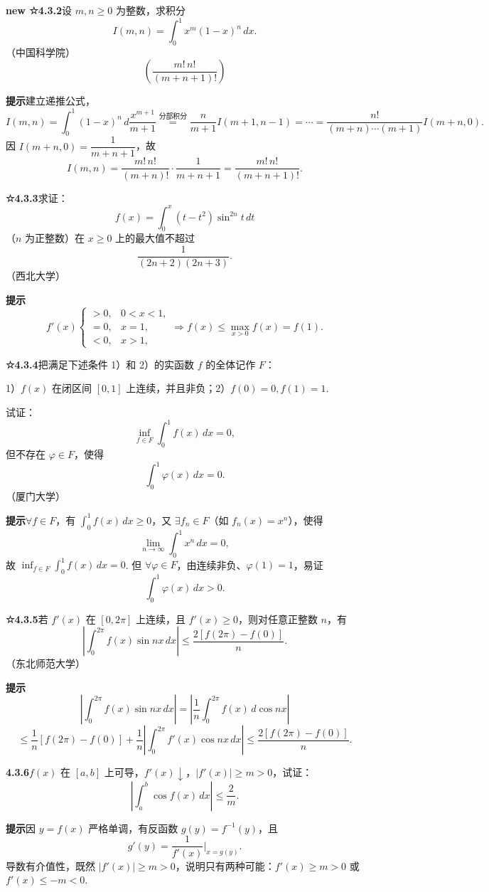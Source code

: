 \documentclass[UTF8, 12pt, fontset=fandol, oneside]{ctexart}
\begin{document}
\noindent\textbf{new ☆4.3.2}\quad 设 $m,n\ge0$ 为整数，求积分
\[
I(m,n)=\int_0^1x^m(1-x)^n\,dx.
\]
（中国科学院）
\[
\left(\frac{m!\,n!}{(m+n+1)!}\right)
\]

\noindent\textbf{提示}\quad 建立递推公式，
\[
I(m,n)=\int_0^1(1-x)^n\,d\frac{x^{m+1}}{m+1}
\stackrel{\text{分部积分}}{=}
\frac n{m+1}I(m+1,n-1)=\cdots
=\frac{n!}{(m+n)\cdots(m+1)}I(m+n,0).
\]
因 $I(m+n,0)=\dfrac1{m+n+1}$，故
\[
I(m,n)=\frac{m!\,n!}{(m+n)!}\cdot\frac1{m+n+1}
=\frac{m!\,n!}{(m+n+1)!}.
\]

\noindent\textbf{☆4.3.3}\quad 求证：
\[
f(x)=\int_0^x(t-t^2)\sin^{2n}t\,dt
\]
（$n$ 为正整数）在 $x\ge0$ 上的最大值不超过
\[
\frac1{(2n+2)(2n+3)}.
\]
（西北大学）

\noindent\textbf{提示}\quad
\[
f'(x)\begin{cases}
>0,&0<x<1,\\
=0,&x=1,\\
<0,&x>1,
\end{cases}
\Rightarrow f(x)\le\max_{x>0}f(x)=f(1).
\]

\noindent\textbf{☆4.3.4}\quad 把满足下述条件 1）和 2）的实函数 $f$ 的全体记作 $F$：

1）$f(x)$ 在闭区间 $[0,1]$ 上连续，并且非负；2）$f(0)=0,f(1)=1$.

试证：
\[
\inf_{f\in F}\int_0^1f(x)\,dx=0,
\]
但不存在 $\varphi\in F$，使得
\[
\int_0^1\varphi(x)\,dx=0.
\]
（厦门大学）

\noindent\textbf{提示}\quad $\forall f\in F$，有 $\displaystyle\int_0^1f(x)\,dx\ge0$，又 $\exists f_n\in F$（如 $f_n(x)=x^n$），使得
\[
\lim_{n\to\infty}\int_0^1x^n\,dx=0,
\]
故 $\displaystyle\inf_{f\in F}\int_0^1f(x)\,dx=0$. 但 $\forall\varphi\in F$，由连续非负、$\varphi(1)=1$，易证
\[
\int_0^1\varphi(x)\,dx>0.
\]

\noindent\textbf{☆4.3.5}\quad 若 $f'(x)$ 在 $[0,2\pi]$ 上连续，且 $f'(x)\ge0$，则对任意正整数 $n$，有
\[
\left|\int_0^{2\pi}f(x)\sin nx\,dx\right|
\le\frac{2[f(2\pi)-f(0)]}{n}.
\]
（东北师范大学）

\noindent\textbf{提示}\quad
\[
\left|\int_0^{2\pi}f(x)\sin nx\,dx\right|
=\left|\frac1n\int_0^{2\pi}f(x)\,d\cos nx\right|
\]
\[
\le\frac1n[f(2\pi)-f(0)]
+\frac1n\left|\int_0^{2\pi}f'(x)\cos nx\,dx\right|
\le\frac{2[f(2\pi)-f(0)]}{n}.
\]

\noindent\textbf{4.3.6}\quad $f(x)$ 在 $[a,b]$ 上可导，$f'(x)\downarrow$，$|f'(x)|\ge m>0$，试证：
\[
\left|\int_a^b\cos f(x)\,dx\right|\le\frac2m.
\]

\noindent\textbf{提示}\quad 因 $y=f(x)$ 严格单调，有反函数 $g(y)=f^{-1}(y)$，且
\[
g'(y)=\frac1{f'(x)}\bigg|_{x=g(y)}.
\]
导数有介值性，既然 $|f'(x)|\ge m>0$，说明只有两种可能：$f'(x)\ge m>0$ 或 $f'(x)\le-m<0$.
\end{document}
